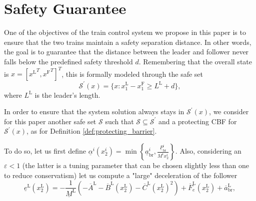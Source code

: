\documentclass[letterpaper, 10 pt, conference]{ieeeconf}
\newcounter{Definition}
\theoremstyle{definition}
\newtheorem{definition}{Definition}
\theoremstyle{nopoint}
\begin{document}
  

  
  
 \section{Safety Guarantee}
 \label{sec:SafetyGuarantee}


\begin{comment}
	\begin{definition}[Braking Controller] \label{def:brakingController}
		Given the model present in \eqref{eq:dynamical_system_param_i} we define  $u^i(t)= K_\mathrm{B}(x^i(t))$ the braking controller as follows
		\begin{equation*}
			K_\mathrm{B}(x^i(t))=
			\begin{cases}
				\tilde{u}^i(x^i(t)) \leq 0 \qquad \mathit{if}\;  x_2^i(t) \geq 0\\
				0 \qquad\qquad\qquad \mathit{if}\;  x_2^i(t) = 0.
			\end{cases}     
		\end{equation*}
	\end{definition}
\end{comment}




One of the objectives of the train control system we propose in this paper is to ensure that the two trains maintain a safety separation distance. In other words, the goal is to guarantee that the distance between the leader and follower never falls below the predefined safety threshold $d$. Remembering that the overall state is $x=[{x^\mathrm{L}}^T,{x^\mathrm{F}}^T]^T$, this is formally modeled through the safe set
%
\begin{equation} \label{eq:distance}
\mathcal{S}^\prime(x)=\{x: x_1^\mathrm{L}- x_1^\mathrm{F} \geq  L^\mathrm{L} +d\},
\end{equation}
where $L^\mathrm{L}$ is the leader's length. 

In order to ensure that the system solution always stays in $\mathcal{S}^\prime(x)$, we consider for this paper another safe set $\mathcal{S}$ such that $\mathcal{S}\subseteq \mathcal{S}^\prime$ and a protecting CBF for $\mathcal{S}^\prime(x)$, as for Definition \ref{def:protecting_barrier}. 


To do so, let us first define $\underline{\alpha}^i \left( x_2^i\right)=\min \left\{\underline{a}^i_\mathrm{br},\frac{\underline{P}^i_\mathrm{br}}{M^i x_2^i} \right\}$. Also, considering an $\varepsilon<1$ (the latter is a tuning parameter that can be chosen slightly less than one to reduce conservatism) let us compute a "large" deceleration of the follower
\begin{equation*}
\underline{e}^\mathrm{L}\left(x_2^\mathrm{L}\right)=-\frac{1}{\underline{M}^\mathrm{L}}  \left(-\overline{A}^\mathrm{L}-\overline{B}^\mathrm{L} (x_2^\mathrm{L})- \overline{C}^\mathrm{L}\left(x_2^\mathrm{L}\right)^2\right)+ \overline{F}_e^\mathrm{L}(x_2^\mathrm{L})+\overline{a}^\mathrm{L}_\mathrm{br}, 
\end{equation*}
\end{document}
